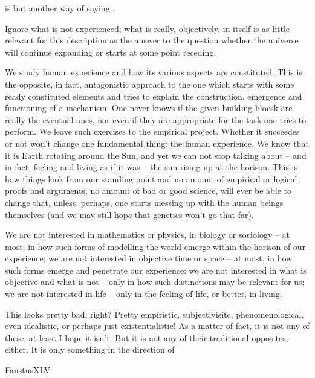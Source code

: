 { is but another way of saying
.


Ignore what is not experienced; what is really, objectively, in-itself is as
little relevant for this description as the answer to the question whether the
universe will continue expanding or starts at some point receding.

We study human experience and how its various aspects are constituted. This is
the opposite, in fact, antagonistic approach to the one which starts with some
ready constituted elements and tries to explain the construction, emergence and
functioning of a mechanism. One never knows if the given building blocsk are
really the eventual ones, nor even if they are appropriate for the task one
tries to perform. We leave such exercises to the empirical project. Whether it
succeedes or not won't change one fundamental thing: the human experience. We
know that it is Earth rotating around the Sun, and yet we can not stop talking
about -- and in fact, feeling and living as if it was -- the sun rising up at
the horison. This is how things look from our standing point and no amount of
empirical or logical proofs and arguments, no amount of bad or good science,
will ever be able to change that, unless, perhaps, one starts messing up with
the human beings themselves (and we may still hope that genetics won't go that
far).

We are not interested in mathematics or physics, in biology or sociology -- at
most, in how such forms of modelling the world emerge within the horison of our
experience; we are not interested in objective time or space -- at most, in how
such forms emerge and penetrate our experience; we are not interested in what is
objective and what is not -- only in how such distinctions may be relevant for
us; we are not interested in life -- only in the feeling of life, or better, in
living. 

This looks pretty bad, right? Pretty empiristic, subjectivisitc,
phenomenological, even idealistic, or perhaps just existentialistic! As a matter
of fact, it is not any of these, at least I hope it isn't.
But it is not any of their traditional opposites, either. It is only something
in the direction of 

\citet{What is typical allows one to retain cold blood, only individually
  conceived matters cause nervous shock. In this consists the peacefulness of
  science.}{Faustus}{XLV}

}
